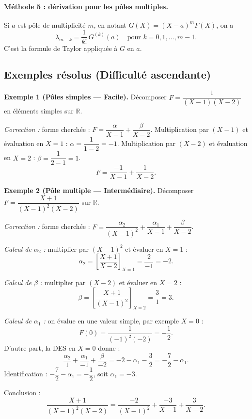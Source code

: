 \paragraph{Méthode 5 : dérivation pour les pôles multiples.}
Si $a$ est pôle de multiplicité $m$, en notant $G(X) = (X - a)^m F(X)$, on a
\[ \lambda_{m - k} = \frac{1}{k!}\, G^{(k)}(a) \quad \text{pour } k = 0, 1, \dots, m - 1. \]
C'est la formule de Taylor appliquée à $G$ en $a$.

\subsection{Exemples résolus (Difficulté ascendante)}

\textbf{Exemple 1 (Pôles simples --- Facile).}
Décomposer $F = \dfrac{1}{(X - 1)(X - 2)}$ en éléments simples sur $\mathbb{R}$.

\textit{Correction :} forme cherchée : $F = \dfrac{\alpha}{X - 1} + \dfrac{\beta}{X - 2}$.
Multiplication par $(X - 1)$ et évaluation en $X = 1$ : $\alpha = \dfrac{1}{1 - 2} = -1$.
Multiplication par $(X - 2)$ et évaluation en $X = 2$ : $\beta = \dfrac{1}{2 - 1} = 1$.
\[ F = \frac{-1}{X - 1} + \frac{1}{X - 2}. \]

\medskip

\textbf{Exemple 2 (Pôle multiple --- Intermédiaire).}
Décomposer $F = \dfrac{X + 1}{(X - 1)^2 (X - 2)}$ sur $\mathbb{R}$.

\textit{Correction :} forme cherchée : $F = \dfrac{\alpha_2}{(X - 1)^2} + \dfrac{\alpha_1}{X - 1} + \dfrac{\beta}{X - 2}$.

\smallskip

\emph{Calcul de $\alpha_2$ :} multiplier par $(X - 1)^2$ et évaluer en $X = 1$ :
\[ \alpha_2 = \left[\frac{X + 1}{X - 2}\right]_{X = 1} = \frac{2}{-1} = -2. \]

\emph{Calcul de $\beta$ :} multiplier par $(X - 2)$ et évaluer en $X = 2$ :
\[ \beta = \left[\frac{X + 1}{(X - 1)^2}\right]_{X = 2} = \frac{3}{1} = 3. \]

\emph{Calcul de $\alpha_1$ :} on évalue en une valeur simple, par exemple $X = 0$ :
\[ F(0) = \frac{1}{(-1)^2 (-2)} = -\frac{1}{2}. \]
D'autre part, la DES en $X = 0$ donne :
\[ \frac{\alpha_2}{1} + \frac{\alpha_1}{-1} + \frac{\beta}{-2} = -2 - \alpha_1 - \frac{3}{2} = -\frac{7}{2} - \alpha_1. \]
Identification : $-\dfrac{7}{2} - \alpha_1 = -\dfrac{1}{2}$, soit $\alpha_1 = -3$.

\smallskip

Conclusion :
\[ \frac{X + 1}{(X - 1)^2 (X - 2)} = \frac{-2}{(X - 1)^2} + \frac{-3}{X - 1} + \frac{3}{X - 2}. \]

